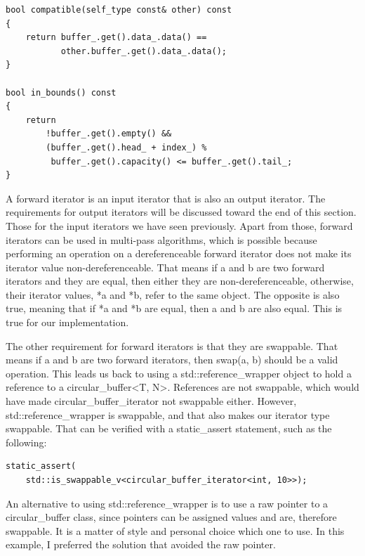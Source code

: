 \begin{lstlisting}[style=styleCXX]
bool compatible(self_type const& other) const
{
	return buffer_.get().data_.data() ==
		   other.buffer_.get().data_.data();
}

bool in_bounds() const
{
	return
		!buffer_.get().empty() &&
		(buffer_.get().head_ + index_) %
		 buffer_.get().capacity() <= buffer_.get().tail_;
}
\end{lstlisting}

A forward iterator is an input iterator that is also an output iterator. The requirements for output iterators will be discussed toward the end of this section. Those for the input iterators we have seen previously. Apart from those, forward iterators can be used in multi-pass algorithms, which is possible because performing an operation on a dereferenceable forward iterator does not make its iterator value non-dereferenceable. That means if a and b are two forward iterators and they are equal, then either they are non-dereferenceable, otherwise, their iterator values, *a and *b, refer to the same object. The opposite is also true, meaning that if *a and *b are equal, then a and b are also equal. This is true for our implementation.

The other requirement for forward iterators is that they are swappable. That means if a and b are two forward iterators, then swap(a, b) should be a valid operation. This leads us back to using a std::reference\_wrapper object to hold a reference to a circular\_buffer<T, N>. References are not swappable, which would have made circular\_buffer\_iterator not swappable either. However, std::reference\_wrapper is swappable, and that also makes our iterator type swappable. That can be verified with a static\_assert statement, such as the following:

\begin{lstlisting}[style=styleCXX]
static_assert(
	std::is_swappable_v<circular_buffer_iterator<int, 10>>);
\end{lstlisting}

\begin{tcolorbox}[breakable,enhanced jigsaw,colback=blue!5!white,colframe=blue!75!black,title={Important Note}]
An alternative to using std::reference\_wrapper is to use a raw pointer to a circular\_buffer class, since pointers can be assigned values and are, therefore swappable. It is a matter of style and personal choice which one to use. In this example, I preferred the solution that avoided the raw pointer.
\end{tcolorbox}

